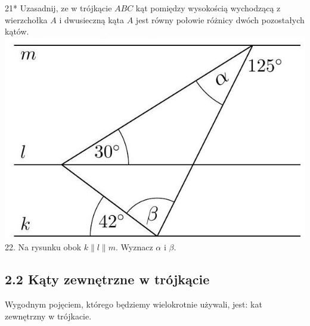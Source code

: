 \documentclass[10pt]{article}
\begin{document}
21* Uzasadnij, ze w trójkącie \(A B C\) kąt pomiędzy wysokością wychodzącą z wierzchołka \(A\) i dwusieczną kąta \(A\) jest równy połowie różnicy dwóch pozostałych kątów.\\
\includegraphics[max width=\textwidth, center]{2024_11_21_71f62bd117d375398909g-021(2)}\\
22. Na rysunku obok \(k\|l\| m\). Wyznacz \(\alpha\) i \(\beta\).

\subsection*{2.2 Kąty zewnętrzne w trójkącie}
Wygodnym pojęciem, którego będziemy wielokrotnie używali, jest: kat zewnętrzny w trójkacie.
\end{document}
